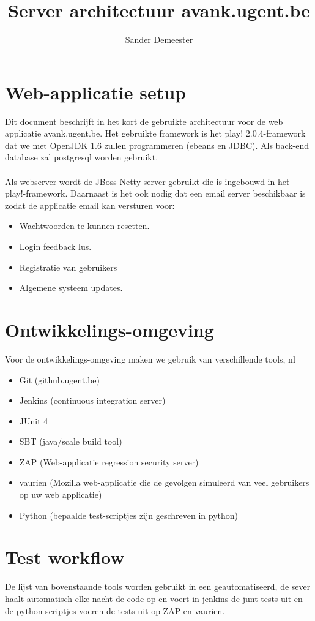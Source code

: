 \documentclass[10pt,a4paper]{report}
\author{Sander Demeester}
\begin{document}
\title{Server architectuur avank.ugent.be}
\section*{Web-applicatie setup}
Dit document beschrijft in het kort de gebruikte architectuur voor de web applicatie avank.ugent.be.
Het gebruikte framework is het play! 2.0.4-framework dat we met OpenJDK 1.6 zullen programmeren  (ebeans en JDBC). Als back-end database zal postgresql worden gebruikt.\\
\\
Als webserver wordt de JBoss Netty server gebruikt die is ingebouwd in het play!-framework.
Daarnaast is het ook nodig dat een email server beschikbaar is zodat de applicatie email kan versturen voor:
\begin{itemize}
\item Wachtwoorden te kunnen resetten.
\item Login feedback lus.
\item Registratie van gebruikers
\item Algemene systeem updates.
\end{itemize}

\section*{Ontwikkelings-omgeving}
Voor de ontwikkelings-omgeving maken we gebruik van verschillende tools, nl
\begin{itemize}
\item Git (github.ugent.be)
\item Jenkins (continuous integration server)
\item JUnit 4
\item SBT (java/scale build tool)
\item ZAP (Web-applicatie regression security server)
\item vaurien (Mozilla web-applicatie die de gevolgen simuleerd van veel gebruikers op uw web applicatie)
\item Python (bepaalde test-scriptjes zijn geschreven in python)
\end{itemize}
\section*{Test workflow}
De lijst van bovenstaande tools worden gebruikt in een geautomatiseerd, de sever haalt automatisch elke nacht de code op en voert in jenkins de junt tests uit en de python scriptjes voeren de tests uit op ZAP en vaurien.
\end{document}
